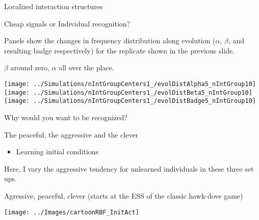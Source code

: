 \documentclass[
  ignorenonframetext,
]{beamer}
\providecommand{\tightlist}{%
  \setlength{\itemsep}{0pt}\setlength{\parskip}{0pt}}
\begin{document}
\begin{frame}{Localized interaction structures}
\protect\hypertarget{localized-interaction-structures-5}{}

\begin{block}{Cheap signals or Individual recognition?}

\small

Panels show the changes in frequency distribution along evolution
(\(\alpha\), \(\beta\), and resulting badge respectively) for the
replicate shown in the previous slide.

\(\beta\) around zero, \(\alpha\) all over the place.

\begin{flushleft}\texttt{[image: ../Simulations/nIntGroupCenters1\_/evolDistAlpha5\_nIntGroup10]} \texttt{[image: ../Simulations/nIntGroupCenters1\_/evolDistBeta5\_nIntGroup10]} \texttt{[image: ../Simulations/nIntGroupCenters1\_/evolDistBadge5\_nIntGroup10]} \end{flushleft}

\end{block}

\end{frame}

\begin{frame}{Why would you want to be recognized?}
\protect\hypertarget{why-would-you-want-to-be-recognized}{}

\pause

\begin{block}{The peaceful, the aggressive and the clever}

\begin{itemize}
\tightlist
\item
  Learning initial conditions
\end{itemize}

\tiny

Here, I vary the aggressive tendency for unlearned individuals in these
three set ups.

Agressive, peaceful, clever (starts at the ESS of the classic hawk-dove
game)

\begin{flushleft}\texttt{[image: ../Images/cartoonRBF\_InitAct]} \end{flushleft}

\end{block}

\end{frame}
\end{document}

